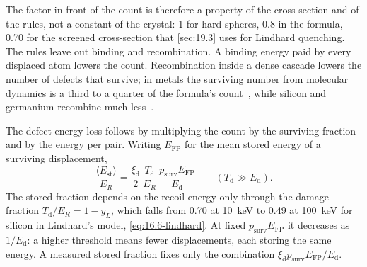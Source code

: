 The factor in front of the count is therefore a property of the cross-section and of the rules, not a constant of the crystal: 1 for hard spheres, 0.8 in the formula, 0.70 for the screened cross-section that \cref{sec:19.3} uses for Lindhard quenching. The rules leave out binding and recombination. A binding energy paid by every displaced atom lowers the count. Recombination inside a dense cascade lowers the number of defects that survive; in metals the surviving number from molecular dynamics is a third to a quarter of the formula's count~\cite{nordlund2018improving}, while silicon and germanium recombine much less~\cite[Sect.~II\,B]{sassi2022energy}.

The defect energy loss follows by multiplying the count by the surviving fraction and by the energy per pair. Writing $E_{\mathrm{FP}}$ for the mean stored energy of a surviving displacement,
\begin{equation}
  \frac{\langle E_{\mathrm{st}}\rangle}{E_R} = \frac{\xi_{\mathrm{d}}}{2}\,\frac{T_{\mathrm{d}}}{E_R}\,\frac{p_{\mathrm{surv}}E_{\mathrm{FP}}}{E_{\mathrm{d}}} \qquad (T_{\mathrm{d}} \gg E_{\mathrm{d}}) .
  \label{eq:19.4-loss}
\end{equation}
The stored fraction depends on the recoil energy only through the damage fraction $T_{\mathrm{d}}/E_R = 1 - y_L$, which falls from 0.70 at \SI{10}{keV} to 0.49 at \SI{100}{keV} for silicon in Lindhard's model, \cref{eq:16.6-lindhard}. At fixed $p_{\mathrm{surv}}E_{\mathrm{FP}}$ it decreases as $1/E_{\mathrm{d}}$: a higher threshold means fewer displacements, each storing the same energy. A measured stored fraction fixes only the combination $\xi_{\mathrm{d}}p_{\mathrm{surv}}E_{\mathrm{FP}}/E_{\mathrm{d}}$.

